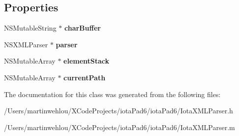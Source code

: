\subsection*{Properties}
\begin{DoxyCompactItemize}
\item 
\hypertarget{interface_iota_x_m_l_parser_a497c11119fe2250b6c014092de118700}{
NSMutableString $\ast$ {\bfseries charBuffer}}
\label{interface_iota_x_m_l_parser_a497c11119fe2250b6c014092de118700}

\item 
\hypertarget{interface_iota_x_m_l_parser_a5dc72d2fe6d7e690f28d6df344a20625}{
NSXMLParser $\ast$ {\bfseries parser}}
\label{interface_iota_x_m_l_parser_a5dc72d2fe6d7e690f28d6df344a20625}

\item 
\hypertarget{interface_iota_x_m_l_parser_aec4f954de4e83bc89f256cb6a9408d32}{
NSMutableArray $\ast$ {\bfseries elementStack}}
\label{interface_iota_x_m_l_parser_aec4f954de4e83bc89f256cb6a9408d32}

\item 
\hypertarget{interface_iota_x_m_l_parser_ab57c62e27ae7b3a4d1db191906a6058d}{
NSMutableArray $\ast$ {\bfseries currentPath}}
\label{interface_iota_x_m_l_parser_ab57c62e27ae7b3a4d1db191906a6058d}

\end{DoxyCompactItemize}


The documentation for this class was generated from the following files:\begin{DoxyCompactItemize}
\item 
/Users/martinwehlou/XCodeProjects/iotaPad6/iotaPad6/IotaXMLParser.h\item 
/Users/martinwehlou/XCodeProjects/iotaPad6/iotaPad6/IotaXMLParser.m\end{DoxyCompactItemize}
